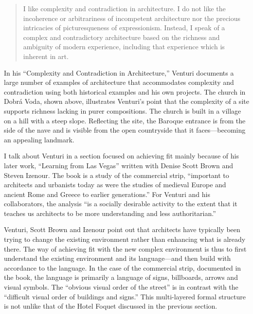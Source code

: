 \begin{quote}
I like complexity and contradiction in architecture. I do not like the incoherence or
arbitrariness of incompetent architecture nor the precious intricacies of picturesqueness
of expressionism. Instead, I speak of a complex and contradictory architecture based on the
richness and ambiguity of modern experience, including that experience which is inherent in art.
\end{quote}

In his ``Complexity and Contradiction in Architecture,'' Venturi documents a large number of
examples of architecture that accommodates complexity and contradiction using both historical
examples and his own projects. The church in Dobrá Voda, shown above, illustrates Venturi's point
that the complexity of a site supports richness lacking in purer compositions.{\citet[p.28]{venturi-1977-complexity}}
The church is built in a village on a hill with a steep slope. Reflecting the site,
the Baroque entrance is from the side of the nave and is visible from the open countryside
that it faces---becoming an appealing landmark.

I talk about Venturi in a section focused on achieving fit mainly because of his later work,
``Learning from Las Vegas'' written with Denise Scott Brown and Steven Izenour.
The book is a study of the commercial strip, ``important to architects and urbanists today
as were the studies of medieval Europe and ancient Rome and Greece to earlier generations.''
For Venturi and his collaborators, the analysis ``is a socially desirable activity to the
extent that it teaches us architects to be more understanding and less authoritarian.''

Venturi, Scott Brown and Izenour point out that architects have typically been trying to change
the existing environment rather than enhancing what is already there. The way of achieving
fit with the new complex environment is thus to first understand the existing environment
and its language---and then build with accordance to the language. In the case of the commercial
strip, documented in the book, the language is primarily a language of signs, billboards, arrows
and visual symbols. The ``obvious visual order of the street'' is in contrast with the ``difficult
visual order of buildings and signs.'' This multi-layered formal structure is not
unlike that of the Hotel Foquet discussed in the previous section.

